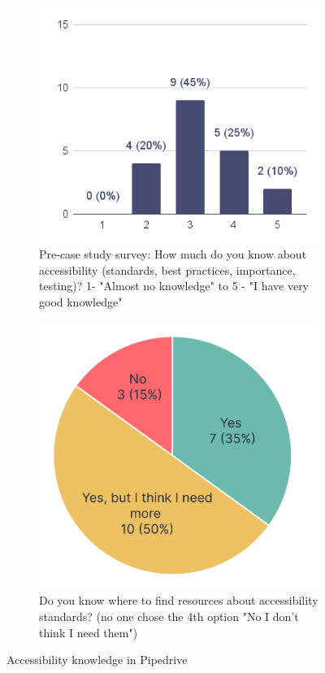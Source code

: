 \documentclass{master_thesis}
\begin{document}
\begin{figure}[H]
    \centering
	\begin{subfigure}{0.5\textwidth}
		\includegraphics[width=\textwidth]{img/a11y-knowledge.png}
		\caption{Pre-case study survey: How much do you know about accessibility (standards, best practices, importance, testing)? 1- "Almost no knowledge" to 5 - "I have very good knowledge" }
		\label{fig:a11y-knowledge-current}
	\end{subfigure}
	\hspace{0.05\textwidth}
	\begin{subfigure}{0.4\textwidth}
		\includegraphics[width=\textwidth]{img/a11y-resources.png}
		\caption{Do you know where to find resources
		about accessibility standards? (no one chose the 4th option "No I don't think I need them") }
    	\label{fig:a11y-resources}
	\end{subfigure}
	\caption{Accessibility knowledge in Pipedrive}
    \label{fig:a11y-knowledge}
\end{figure}
\end{document}
